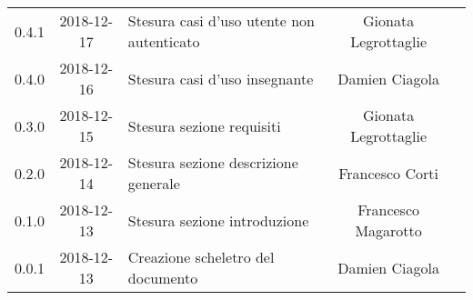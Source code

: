 {\begin{longtable}{ c c C{6cm} c c }
		0.4.1 & 
		2018-12-17 &  
		Stesura casi d'uso utente non autenticato &	
		Gionata Legrottaglie &	
		\reda{} \\
		
		0.4.0 & 
		2018-12-16 &  
		Stesura casi d'uso insegnante &	
		Damien Ciagola &	
		\reda{} \\
		
		0.3.0 & 
		2018-12-15 &  
		Stesura sezione requisiti &	
		Gionata Legrottaglie &	
		\reda{} \\
		
		0.2.0 & 
		2018-12-14 &  
		Stesura sezione descrizione generale	&	
		Francesco Corti &
		\reda{} \\
		
		0.1.0 & 
		2018-12-13 &  
		Stesura sezione introduzione &	
		Francesco Magarotto &	
		\reda{}  \\
		
		0.0.1 & 
		2018-12-13 &  
		Creazione scheletro del documento&	
		Damien Ciagola  &	
		\reda{}  \\
	\end{longtable}

}